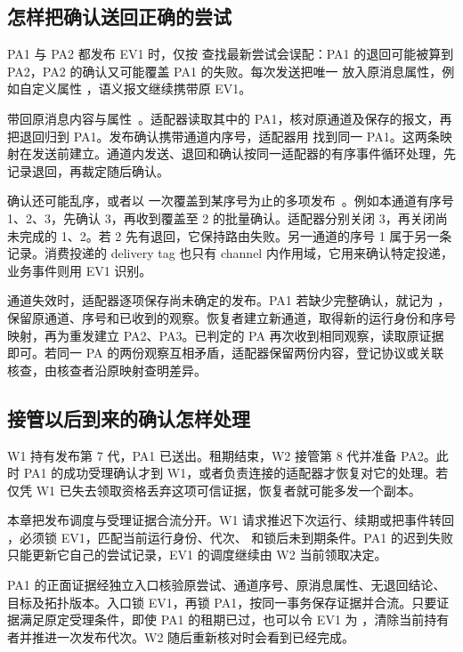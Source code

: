 \subsection*{怎样把确认送回正确的尝试}

PA1 与 PA2 都发布 EV1 时，仅按  查找最新尝试会误配：PA1 的退回可能被算到 PA2，PA2 的确认又可能覆盖 PA1 的失败。每次发送把唯一  放入原消息属性，例如自定义属性 ，语义报文继续携带原 EV1。

 带回原消息内容与属性~\cite{amqp091}。适配器读取其中的 PA1，核对原通道及保存的报文，再把退回归到 PA1。发布确认携带通道内序号，适配器用  找到同一 PA1。这两条映射在发送前建立。通道内发送、退回和确认按同一适配器的有序事件循环处理，先记录退回，再裁定随后确认。


确认还可能乱序，或者以  一次覆盖到某序号为止的多项发布~\cite{rabbitmq-confirms}。例如本通道有序号 1、2、3，先确认 3，再收到覆盖至 2 的批量确认。适配器分别关闭 3，再关闭尚未完成的 1、2。若 2 先有退回，它保持路由失败。另一通道的序号 1 属于另一条记录。消费投递的 delivery tag 也只有 channel 内作用域，它用来确认特定投递，业务事件则用 EV1 识别。

通道失效时，适配器逐项保存尚未确定的发布。PA1 若缺少完整确认，就记为 ，保留原通道、序号和已收到的观察。恢复者建立新通道，取得新的运行身份和序号映射，再为重发建立 PA2、PA3。已判定的 PA 再次收到相同观察，读取原证据即可。若同一 PA 的两份观察互相矛盾，适配器保留两份内容，登记协议或关联核查，由核查者沿原映射查明差异。

\subsection*{接管以后到来的确认怎样处理}

W1 持有发布第 7 代，PA1 已送出。租期结束，W2 接管第 8 代并准备 PA2。此时 PA1 的成功受理确认才到 W1，或者负责连接的适配器才恢复对它的处理。若仅凭 W1 已失去领取资格丢弃这项可信证据，恢复者就可能多发一个副本。

本章把发布调度与受理证据合流分开。W1 请求推迟下次运行、续期或把事件转回 ，必须锁 EV1，匹配当前运行身份、代次、 和锁后未到期条件。PA1 的迟到失败只能更新它自己的尝试记录，EV1 的调度继续由 W2 当前领取决定。

PA1 的正面证据经独立入口核验原尝试、通道序号、原消息属性、无退回结论、目标及拓扑版本。入口锁 EV1，再锁 PA1，按同一事务保存证据并合流。只要证据满足原定受理条件，即使 PA1 的租期已过，也可以令 EV1 为 ，清除当前持有者并推进一次发布代次。W2 随后重新核对时会看到已经完成。


